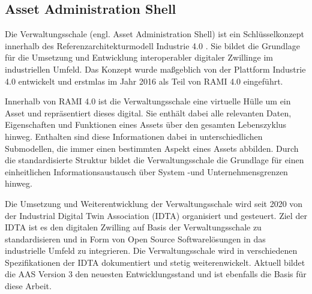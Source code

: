 





\subsection{Asset Administration Shell}
Die Verwaltungsschale (engl. Asset Administration Shell) ist ein Schlüsselkonzept innerhalb des Referenzarchitekturmodell Industrie 4.0 \cite{RAMI4.0}. Sie bildet die Grundlage für die Umsetzung und Entwicklung interoperabler digitaler Zwillinge im industriellen Umfeld.
Das Konzept wurde maßgeblich von der Plattform Industrie 4.0 entwickelt und erstmlas im Jahr 2016 als Teil von RAMI 4.0 eingeführt.

Innerhalb von RAMI 4.0 ist die Verwaltungsschale eine virtuelle Hülle um ein Asset und repräsentiert dieses digital.
Sie enthält dabei alle relevanten Daten, Eigenschaften und Funktionen eines Assets über den gesamten Lebenszyklus hinweg.
Enthalten sind diese Informationen dabei in unterschiedlichen Submodellen, die immer einen bestimmten Aspekt eines Assets abbilden. 
Durch die standardisierte Struktur bildet die Verwaltungsschale die Grundlage für einen einheitlichen Informationsaustausch über System -und Unternehmensgrenzen hinweg.

Die Umsetzung und Weiterentwicklung der Verwaltungsschale wird seit 2020 von der Industrial Digital Twin Association (IDTA) organisiert und gesteuert.
Ziel der IDTA ist es den digitalen Zwilling auf Basis der Verwaltungsschale zu standardisieren und in Form von Open Source Softwarelösungen in das industrielle Umfeld zu integrieren.
Die Verwaltungsschale wird in verschiedenen Spezifikationen der IDTA dokumentiert und stetig weiterenwickelt.
Aktuell bildet die AAS Version 3 den neuesten Entwicklungsstand und ist ebenfalls die Basis für diese Arbeit.

